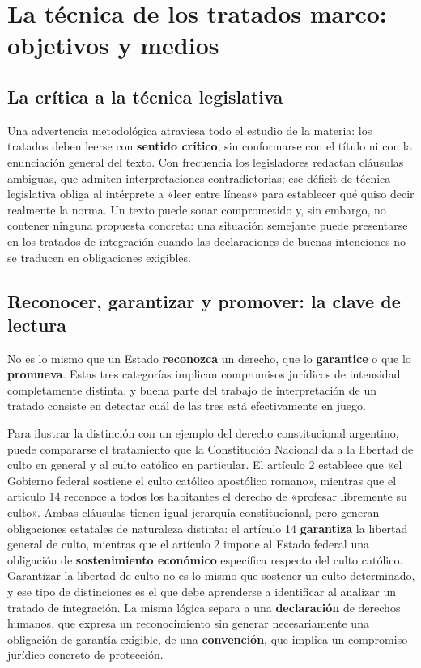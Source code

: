 \documentclass[12pt,oneside]{book}
\renewcommand{\chaptermark}[1]{\markboth{\thechapter.\ #1}{}}
\begin{document}
\chapter{La técnica de los tratados marco: objetivos y medios}
\chaptermark{Tratados marco: objetivos y medios}

\section{La crítica a la técnica legislativa}

Una advertencia metodológica atraviesa todo el estudio de la materia: los tratados deben leerse con \textbf{sentido crítico}, sin conformarse con el título ni con la enunciación general del texto. Con frecuencia los legisladores redactan cláusulas ambiguas, que admiten interpretaciones contradictorias; ese déficit de técnica legislativa obliga al intérprete a «leer entre líneas» para establecer qué quiso decir realmente la norma. Un texto puede sonar comprometido y, sin embargo, no contener ninguna propuesta concreta: una situación semejante puede presentarse en los tratados de integración cuando las declaraciones de buenas intenciones no se traducen en obligaciones exigibles.

\section{Reconocer, garantizar y promover: la clave de lectura}

\begin{importante}
No es lo mismo que un Estado \textbf{reconozca} un derecho, que lo \textbf{garantice} o que lo \textbf{promueva}. Estas tres categorías implican compromisos jurídicos de intensidad completamente distinta, y buena parte del trabajo de interpretación de un tratado consiste en detectar cuál de las tres está efectivamente en juego.
\end{importante}

Para ilustrar la distinción con un ejemplo del derecho constitucional argentino, puede compararse el tratamiento que la Constitución Nacional da a la libertad de culto en general y al culto católico en particular. El artículo 2 establece que «el Gobierno federal sostiene el culto católico apostólico romano», mientras que el artículo 14 reconoce a todos los habitantes el derecho de «profesar libremente su culto». Ambas cláusulas tienen igual jerarquía constitucional, pero generan obligaciones estatales de naturaleza distinta: el artículo 14 \textbf{garantiza} la libertad general de culto, mientras que el artículo 2 impone al Estado federal una obligación de \textbf{sostenimiento económico} específica respecto del culto católico. Garantizar la libertad de culto no es lo mismo que sostener un culto determinado, y ese tipo de distinciones es el que debe aprenderse a identificar al analizar un tratado de integración. La misma lógica separa a una \textbf{declaración} de derechos humanos, que expresa un reconocimiento sin generar necesariamente una obligación de garantía exigible, de una \textbf{convención}, que implica un compromiso jurídico concreto de protección.
\end{document}
